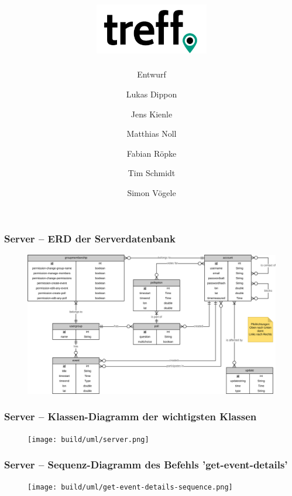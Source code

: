 \documentclass[aspectratio=1610]{beamer}
\title{\includegraphics[width = 50mm]{images/logo_crop.png}}
\subtitle{\huge Entwurf}
\author{Lukas Dippon
	\and Jens Kienle
	\and Matthias Noll
	\and Fabian Röpke
	\and Tim Schmidt
	\and Simon Vögele}
\begin{document}
	\begin{frame}[plain]
	\maketitle
	\end{frame}


	\begin{frame}[plain]
        \frametitle{\textbf{Server} -- ERD der Serverdatenbank}
        \begin{figure}[!htb]
            \centering
            \includegraphics[width = \columnwidth]{images/erd-complete.png}
        \end{figure}
    \end{frame}

	\begin{frame}[plain]
        \frametitle{\textbf{Server} -- Klassen-Diagramm der wichtigsten Klassen}
        \begin{figure}[!htb]
            \centering
            \texttt{[image: build/uml/server.png]}
        \end{figure}
	\end{frame}

	\begin{frame}[plain]
        \frametitle{\textbf{Server} -- Sequenz-Diagramm des Befehls 'get-event-details'}
        \begin{figure}[!htb]
            \centering
            \texttt{[image: build/uml/get-event-details-sequence.png]}
        \end{figure}
    \end{frame}


\end{document}
